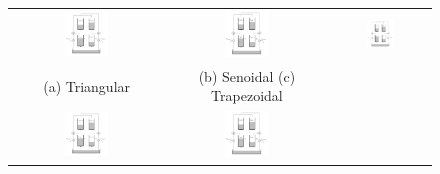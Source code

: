 \begin{figure}[H]
	\centering
\begin{tabular}{ccc}
	\includegraphics[width=0.3\textwidth,keepaspectratio]{img/4tank.png} &
	\includegraphics[width=0.3\textwidth,keepaspectratio]{img/4tank.png} &
	\includegraphics[width=0.3\textwidth,keepaspectratio]{img/4tank.png} \\
	(a) Triangular &
	(b) Senoidal
	(c) Trapezoidal \\
	\includegraphics[width=0.3\textwidth,keepaspectratio]{img/4tank.png} &
	\includegraphics[width=0.3\textwidth,keepaspectratio]{img/4tank.png} &

\end{tabular}
\end{figure}
